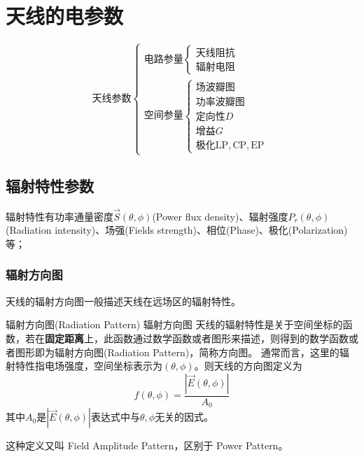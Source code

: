 \chapter{天线的电参数}
\begin{equation*}
\mbox{天线参数}
\begin{cases}
    \mbox{电路参量}
    \begin{cases}
        \mbox{天线阻抗}\\
        \mbox{辐射电阻}
    \end{cases}\\
    \mbox{空间参量}
    \begin{cases}
        \mbox{场波瓣图}\\
        \mbox{功率波瓣图}\\
        \mbox{定向性}D\\
        \mbox{增益}G\\
        \mbox{极化}\mathrm{LP},\mathrm{CP},\mathrm{EP}
    \end{cases}
\end{cases}
\end{equation*}

\section{辐射特性参数}
    辐射特性有功率通量密度$\vec{S}(\theta,\phi)$(Power flux density)、辐射强度$P_r(\theta,\phi)$(Radiation intensity)、场强(Fields strength)、相位(Phase)、极化(Polarization)等；

    \subsection{辐射方向图}
    天线的辐射方向图一般描述天线在远场区的辐射特性。
    \begin{definition}
    {辐射方向图(Radiation Pattern)}
    {辐射方向图}
    天线的辐射特性是关于空间坐标的函数，若在\textbf{固定距离}上，此函数通过数学函数或者图形来描述，则得到的数学函数或者图形即为辐射方向图(Radiation Pattern)，简称方向图。
    \tcblower
    通常而言，这里的辐射特性指电场强度，空间坐标表示为$(\theta,\phi)$。则天线的方向图定义为
    \begin{equation}
        f(\theta,\phi)=\frac{|\vec{E}(\theta,\phi)|}{A_0}
    \end{equation}
    其中$A_0$是$|\vec{E}(\theta,\phi)|$表达式中与$\theta,\phi$无关的因式。
    
    这种定义又叫 Field Amplitude Pattern，区别于 Power Pattern。
    \end{definition}    
    

